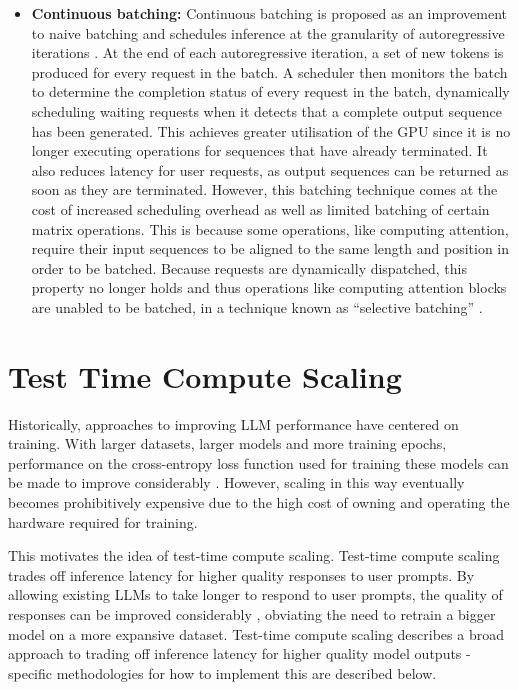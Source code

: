 \documentclass[12pt,twoside]{report}
\begin{document}
\begin{itemize}
  \item \textbf{Continuous batching:} Continuous batching is proposed as an improvement to naive batching and schedules inference at the granularity of autoregressive iterations \cite{yu2022orca}.
    At the end of each autoregressive iteration, a set of new tokens is produced for every request in the batch.    
    A scheduler then monitors the batch to determine the completion status of every request in the batch, dynamically scheduling waiting requests when it detects that a complete output sequence has been generated.
    This achieves greater utilisation of the GPU since it is no longer executing operations for sequences that have already terminated.
    It also reduces latency for user requests, as output sequences can be returned as soon as they are terminated.
    However, this batching technique comes at the cost of increased scheduling overhead as well as limited batching of certain matrix operations.
    This is because some operations, like computing attention, require their input sequences to be aligned to the same length and position in order to be batched.
    Because requests are dynamically dispatched, this property no longer holds and thus operations like computing attention blocks are unabled to be batched, in a technique known as ``selective batching'' \cite{yu2022orca}.
\end{itemize}

\section{Test Time Compute Scaling}\label{section:testtimecompute}
Historically, approaches to improving LLM performance have centered on training. 
With larger datasets, larger models and more training epochs, performance on the cross-entropy loss function used for training these models can be made to improve considerably \cite{kaplan2020scaling}.  
However, scaling in this way eventually becomes prohibitively expensive due to the high cost of owning and operating the hardware required for training.

This motivates the idea of test-time compute scaling.
Test-time compute scaling trades off inference latency for higher quality responses to user prompts. 
By allowing existing LLMs to take longer to respond to user prompts, the quality of responses can be improved considerably \cite{snell2024scaling}, obviating the need to retrain a bigger model on a more expansive dataset.
Test-time compute scaling describes a broad approach to trading off inference latency for higher quality model outputs - specific methodologies for how to implement this are described below.
\end{document}
